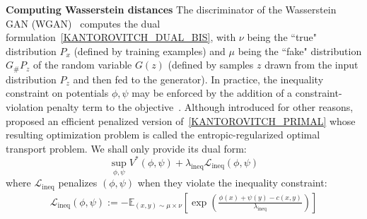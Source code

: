 \documentclass[runningheads]{llncs}
\newcommand\mycitet[1]{\cite{#1}}
\begin{document}
\textbf{Computing Wasserstein distances} The discriminator of the Wasserstein GAN (WGAN)~\citep{arjovsky2017wasserstein} computes the dual formulation~\eqref{KANTOROVITCH_DUAL_BIS}, with $\nu$ being the ``true" distribution $P_x$ (defined by training examples) and $\mu$ being the ``fake" distribution $G_\# P_z$ of the random variable $G(z)$ (defined by samples $z$ drawn from the input distribution $P_z$ and then fed to the generator). In practice, the inequality constraint on potentials $\phi,\psi$ may be enforced by the addition of a constraint-violation penalty term to the objective~\citep{gulrajani2017improved}. Although introduced for other reasons, \mycitet{cuturi2013sinkhorn} proposed an efficient penalized version of~\eqref{KANTOROVITCH_PRIMAL} whose resulting optimization problem is called the entropic-regularized optimal transport problem. We shall only provide its dual form: 
\begin{equation}
\sup_{\phi,\psi} V^*(\phi,\psi) + \lambda_{\text{ineq}} \mathcal{L}_{\text{ineq}}(\phi,\psi)
\label{INEQ_REGULARIZED_DUAL_BIS}
\end{equation}
where $\mathcal{L}_{\text{ineq}}$ penalizes $(\phi,\psi)$ when they violate the inequality constraint:
\begin{align}
    \mathcal{L}_{\text{ineq}}(\phi,\psi):= - \mathds{E}_{(x,y) \sim \mu \times \nu} \left[\exp\left({\frac{\phi(x)+\psi(y)-c(x,y)}{\lambda_{\text{ineq}}}}\right)\right]
\end{align} 
\end{document}
